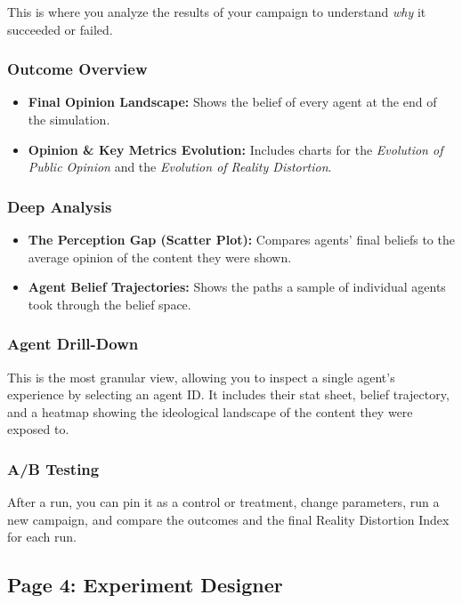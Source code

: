\documentclass[11pt, a4paper]{article}
\begin{document}
This is where you analyze the results of your campaign to understand \textit{why} it succeeded or failed.

\subsubsection{Outcome Overview}
\begin{itemize}
    \item \textbf{Final Opinion Landscape:} Shows the belief of every agent at the end of the simulation.
    \item \textbf{Opinion \& Key Metrics Evolution:} Includes charts for the \textit{Evolution of Public Opinion} and the \textit{Evolution of Reality Distortion}.
\end{itemize}

\subsubsection{Deep Analysis}
\begin{itemize}
    \item \textbf{The Perception Gap (Scatter Plot):} Compares agents' final beliefs to the average opinion of the content they were shown.
    \item \textbf{Agent Belief Trajectories:} Shows the paths a sample of individual agents took through the belief space.
\end{itemize}

\subsubsection{Agent Drill-Down}
This is the most granular view, allowing you to inspect a single agent's experience by selecting an agent ID. It includes their stat sheet, belief trajectory, and a heatmap showing the ideological landscape of the content they were exposed to.

\subsubsection{A/B Testing}
After a run, you can pin it as a control or treatment, change parameters, run a new campaign, and compare the outcomes and the final Reality Distortion Index for each run.

\subsection{Page 4: Experiment Designer}
\end{document}
